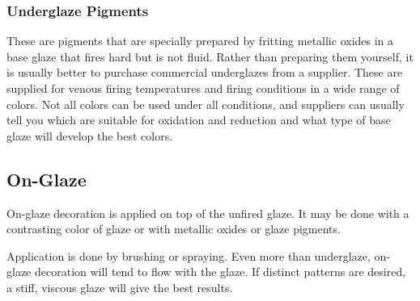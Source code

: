 \subsubsection{Underglaze Pigments}
These are pigments that are specially prepared by fritting metallic oxides in a 
base glaze that fires hard but is not fluid. Rather than preparing them 
yourself, it is usually better to purchase commercial underglazes from a 
supplier. These are supplied for venous firing temperatures and firing 
conditions in a wide range of colors. Not all colors can be used under all 
conditions, and suppliers can usually tell you which are suitable for oxidation 
and reduction and what type of base glaze will develop the best colors.
\subsection{On-Glaze}
On-glaze decoration is applied on top of the unfired glaze. It may be done with 
a contrasting color of glaze or with metallic oxides or glaze pigments.

Application is done by brushing or spraying. Even more than underglaze, 
on-glaze decoration will tend to flow with the glaze. If distinct patterns are 
desired, a stiff, viscous glaze will give the best results.

